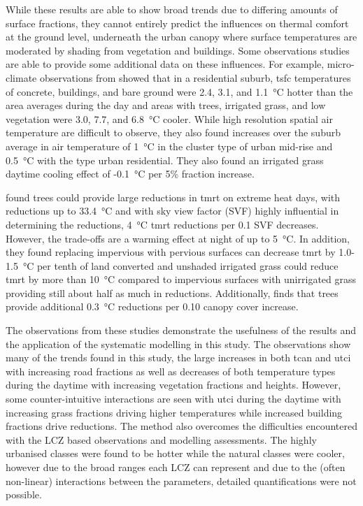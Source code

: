 \documentclass[final,3p,times,authoryear]{elsarticle}
\begin{document}
While these results are able to show broad trends due to differing amounts of surface fractions, they cannot entirely predict the influences on thermal comfort at the ground level, underneath the urban canopy where surface temperatures are moderated by shading from vegetation and buildings. Some observations studies are able to provide some additional data on these influences. For example, micro-climate observations from \cite{Broadbent2017a} showed that in a residential suburb, \gls{tsfc} temperatures of concrete, buildings, and bare ground were 2.4, 3.1, and 1.1\SI{}{\degreeCelsius} hotter than the area averages during the day and areas with trees, irrigated grass, and low vegetation were 3.0, 7.7, and 6.8\SI{}{\degreeCelsius} cooler. While high resolution spatial air temperature are difficult to observe, they also found increases over the suburb average in air temperature of 1\SI{}{\degreeCelsius} in the cluster type of urban mid-rise and 0.5\SI{}{\degreeCelsius} with the type urban residential. They also found an irrigated grass daytime cooling effect of -0.1\SI{}{\degreeCelsius} per 5\% fraction increase.

\cite{Middel2019a} found trees could provide large reductions in \gls{tmrt} on extreme heat days, with reductions up to 33.4\SI{}{\degreeCelsius} and with sky view factor (SVF) highly influential in determining the reductions, 4\SI{}{\degreeCelsius} \gls{tmrt} reductions per 0.1 SVF decreases. However, the trade-offs are a warming effect at night of up to 5\SI{}{\degreeCelsius}. In addition, they found replacing impervious with pervious surfaces can decrease \gls{tmrt} by 1.0-1.5\SI{}{\degreeCelsius} per tenth of land converted and unshaded irrigated grass could reduce \gls{tmrt} by more than 10\SI{}{\degreeCelsius} compared to impervious surfaces with unirrigated grass providing still about half as much in reductions. Additionally, \cite{Krayenhoff2021} finds that trees provide additional 0.3\SI{}{\degreeCelsius} reductions per 0.10 canopy cover increase.

The observations from these studies demonstrate the usefulness of the results and the application of the systematic modelling in this study. The observations show many of the trends found in this study, the large increases in both \gls{tcan} and \gls{utci} with increasing road fractions as well as decreases of both temperature types during the daytime with increasing vegetation fractions and heights. However, some counter-intuitive interactions are seen with \gls{utci} during the daytime with increasing grass fractions driving higher temperatures while increased building fractions drive reductions.  The method also overcomes the difficulties encountered with the LCZ based observations and modelling assessments. The highly urbanised classes were found to be hotter while the natural classes were cooler, however due to the broad ranges each LCZ can represent and due to the (often non-linear) interactions between the parameters, detailed quantifications were not possible. 
\end{document}
